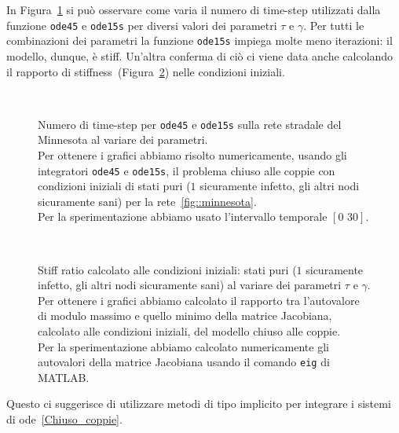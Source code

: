 In Figura~\ref{fig::minnesota_lenght} si pu\`o osservare come varia il numero di time-step  utilizzati dalla  funzione \texttt{ode45} e \texttt{ode15s} per diversi valori dei parametri $\tau$ e $\gamma$. Per tutti le combinazioni dei parametri la funzione \texttt{ode15s} impiega molte meno iterazioni: il modello, dunque, \`e stiff. Un'altra conferma di ci\`o ci viene data anche calcolando il rapporto di stiffness~(Figura~\ref{fig::minnesota_ratiostiff}) nelle condizioni iniziali.\\
\begin{figure}[htbp]
\centering
\subfloat[][$\gamma=0.10$]{}
\subfloat[][$\gamma=0.30$]{}
\\
\subfloat[][$\gamma=0.50$]{}
\subfloat[][$\gamma=0.70$]{}
\caption[Numero di time-step per \texttt{ode45} e \texttt{ode15s}  sulla rete stradale del Minnesota al variare dei parametri]{Numero di time-step  per \texttt{ode45} e \texttt{ode15s}  sulla rete stradale del Minnesota al variare dei parametri.\\Per ottenere i grafici abbiamo risolto numericamente,  usando gli integratori \texttt{ode45} e \texttt{ode15s},  il problema chiuso alle coppie con condizioni iniziali  di stati puri ($1$ sicuramente infetto, gli altri nodi sicuramente sani) per la rete~\ref{fig::minnesota}.\\
Per la sperimentazione abbiamo usato l'intervallo temporale $[0 \,\,30]$.}
\label{fig::minnesota_lenght}
\end{figure}
\begin{figure}[htbp]
\centering
\subfloat[][$\gamma=0.10$]{}
\subfloat[][$\gamma=0.30$]{}
\\
\subfloat[][$\gamma=0.50$]{}
\subfloat[][$\gamma=0.70$]{}
\caption[Stiff ratio alle condizioni iniziali sulla rete stradale del Minnesota al variare dei parametri ]{Stiff ratio calcolato alle condizioni iniziali:  stati puri ($1$ sicuramente infetto, gli altri nodi sicuramente sani) al variare dei parametri $\tau$ e $\gamma$.\\ Per ottenere i grafici abbiamo calcolato il rapporto tra l'autovalore di modulo massimo e quello minimo della matrice Jacobiana, calcolato alle condizioni iniziali, del modello chiuso alle coppie.\\
Per la sperimentazione abbiamo calcolato numericamente gli autovalori della matrice Jacobiana usando il comando \texttt{eig} di MATLAB.}
\label{fig::minnesota_ratiostiff}
\end{figure}
Questo ci suggerisce di utilizzare metodi di tipo implicito per integrare i sistemi di ode~\eqref{Chiuso_coppie}.

